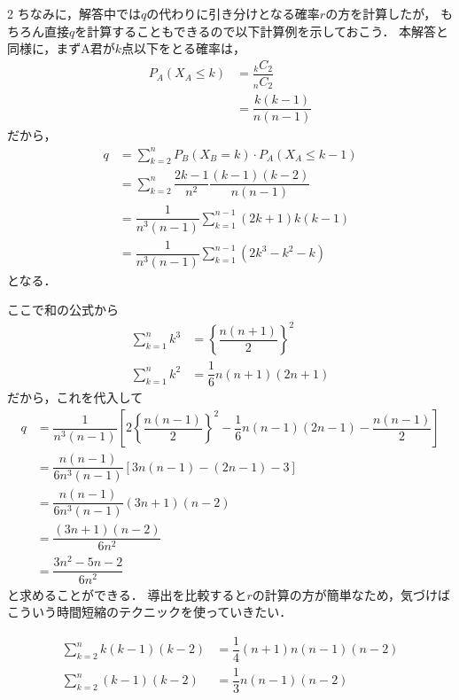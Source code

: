 \documentclass[../../main.tex]{subfiles}
\begin{document}
\begin{multicols}{2}
  ちなみに，解答中では$q$の代わりに引き分けとなる確率$r$の方を計算したが，
  もちろん直接$q$を計算することもできるので以下計算例を示しておこう．
  本解答と同様に，まずA君が$k$点以下をとる確率は，
  \begin{align}
    P_A(X_A \le k)
    & = \dfrac{{}_{k}C_2}{{}_nC_2} \\
    & = \dfrac{k(k-1)}{n(n-1)}
  \end{align}
  だから，
  \begin{align}
    q
    & = \sum_{k=2}^n P_B(X_B=k) \cdot P_A(X_A \le k-1)          \\
    & = \sum_{k=2}^n \dfrac{2k-1}{n^2} \dfrac{(k-1)(k-2)}{n(n-1)} \\
    & = \dfrac{1}{n^3(n-1)} \sum_{k=1}^{n-1} (2k+1)k(k-1) \\
    & = \dfrac{1}{n^3(n-1)} \sum_{k=1}^{n-1} (2k^3-k^2-k)
  \end{align}
  となる．

  ここで和の公式から
  \begin{align}
    \sum_{k=1}^{n} k^3 & = \left\{\dfrac{n(n+1)}{2}\right\}^2 \\
    \sum_{k=1}^{n} k^2 & = \dfrac{1}{6}n(n+1)(2n+1)
  \end{align}
  だから，これを代入して
  \begin{align}
    q
    & =  \dfrac{1}{n^3(n-1)} \left[2\left\{\dfrac{n(n-1)}{2}\right\}^2 - \dfrac{1}{6}n(n-1)(2n-1) - \dfrac{n(n-1)}{2}\right] \\
    & =  \dfrac{n(n-1)}{6n^3(n-1)} \left[3n(n-1) - (2n-1) - 3\right]                                                      \\
    & =  \dfrac{n(n-1)}{6n^3(n-1)}(3n+1)(n-2)                                                                             \\
    & =  \dfrac{(3n+1)(n-2)}{6n^2}                                                                                        \\
    & =  \dfrac{3n^2-5n-2}{6n^2}
  \end{align}
  と求めることができる．
  導出を比較すると$r$の計算の方が簡単なため，気づけばこういう時間短縮のテクニックを使っていきたい．


  \begin{align}
    \sum_{k=2}^n k(k-1)(k-2)
    & = \dfrac{1}{4} (n+1)n(n-1)(n-2) \\
    \sum_{k=2}^n (k-1)(k-2) & = \dfrac{1}{3} n(n-1)(n-2)
  \end{align}
  \newpage
\end{multicols}
\end{document}
